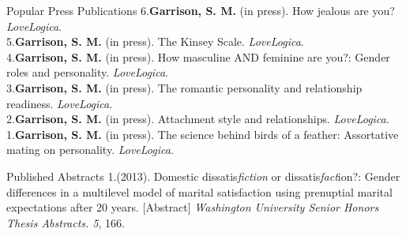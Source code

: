 \documentclass {resume}
\newcommand{\meb}{{\bf Garrison, S. M.}\xspace}
\begin{document}
\pagestyle{myheadings}
\begin{samepage}\begin{rSection}{\textrm{Popular Press Publications}}
6.\hspace* {2.5 mm}\textbf{Garrison, S. M.} (in press). How jealous are you? \textit{LoveLogica}.\smallskip\\
5.\hspace* {2.5 mm}\textbf{Garrison, S. M.} (in press). The Kinsey Scale. \textit{LoveLogica}.\smallskip\\
4.\hspace* {2.5 mm}\textbf{Garrison, S. M.} (in press). How masculine AND feminine are you?: Gender roles and personality. \textit{LoveLogica}.\smallskip\\
3.\hspace* {2.5 mm}\textbf{Garrison, S. M.} (in press). %
The romantic personality and relationship readiness. \textit{LoveLogica}.\smallskip\\
2.\hspace* {2.5 mm}\textbf{Garrison, S. M.} (in press). Attachment style and relationships. \textit{LoveLogica}.\smallskip\\
1.\hspace* {2.5 mm}\textbf{Garrison, S. M.} (in press). The science behind birds of a feather: Assortative mating on personality. \textit{LoveLogica}.
\end{rSection}\end{samepage}
\pagebreak
\begin{samepage}\begin{rSection}{\textrm{Published Abstracts}}
1.\hspace* {2.5 mm}\meb (2013). Domestic dissatis{\em fiction} or dissatis{\em fact}ion?: Gender differences in a multilevel model \hspace* {6 mm}of marital satisfaction using prenuptial marital expectations after 20 years. [Abstract] {\em Washington University \hspace* {6 mm}Senior Honors Thesis Abstracts. 5}, 166.\end{rSection}\end{samepage}%
\end{document}
